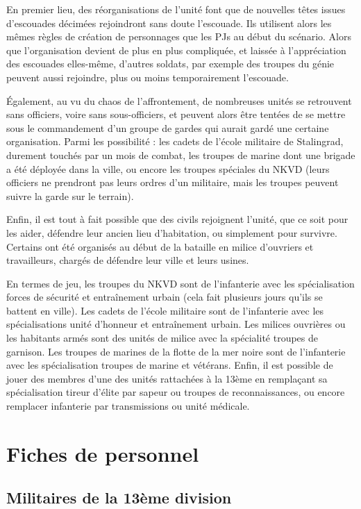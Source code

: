 \documentclass{report}
\begin{document}
\begin{multicols}{2}
En premier lieu, des réorganisations de l'unité font que de nouvelles têtes issues d'escouades décimées rejoindront sans doute l'escouade. Ils utilisent alors les mêmes règles de création de personnages que les PJs au début du scénario. Alors que l'organisation devient de plus en plus compliquée, et laissée  à l'appréciation des escouades elles-même, d'autres soldats, par exemple des troupes du génie peuvent aussi rejoindre, plus ou moins temporairement l'escouade.

Également, au vu du chaos de l'affrontement, de nombreuses unités se retrouvent sans officiers, voire sans sous-officiers, et peuvent alors être tentées de se mettre sous le commandement d'un groupe de gardes qui aurait gardé une certaine organisation. Parmi les possibilité : les cadets de l'école militaire de Stalingrad, durement touchés par un mois de combat, les troupes de marine dont une brigade a été déployée dans la ville, ou encore les troupes spéciales du NKVD (leurs officiers ne prendront pas leurs ordres d'un militaire, mais les troupes peuvent suivre la garde sur le terrain).

Enfin, il est tout à fait possible que des civils rejoignent l'unité, que ce soit pour les aider, défendre leur ancien lieu d'habitation, ou simplement pour survivre. Certains ont été organisés au début de la bataille en milice d'ouvriers et travailleurs, chargés de défendre leur ville et leurs usines.

En termes de jeu, les troupes du NKVD sont de l'infanterie avec les spécialisation forces de sécurité et entraînement urbain (cela fait plusieurs jours qu'ils se battent en ville). Les cadets de l'école militaire sont de l'infanterie avec les spécialisations unité d'honneur et entraînement urbain. Les milices ouvrières ou les habitants armés sont des unités de milice avec la spécialité troupes de garnison. Les troupes de marines de la flotte de la mer noire sont de l'infanterie avec les spécialisation troupes de marine et vétérans. Enfin, il est possible de jouer des membres d'une des unités rattachées à la 13ème en remplaçant sa spécialisation tireur d'élite par sapeur ou troupes de reconnaissances, ou encore remplacer infanterie par transmissions ou unité médicale.
\section{Fiches de personnel}
\subsection{Militaires de la 13ème division}

\end{multicols}
\end{document}
